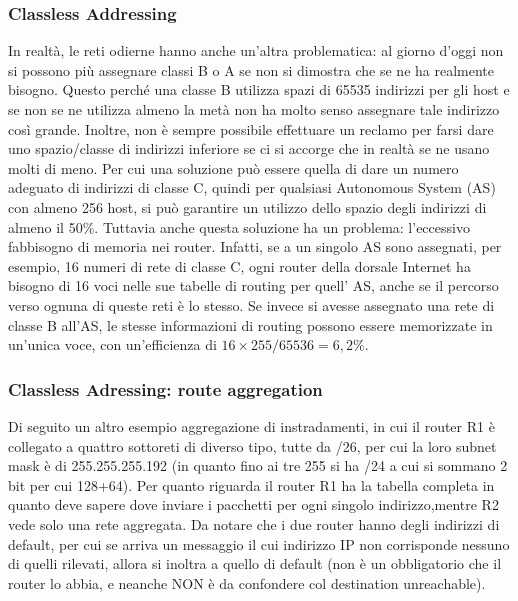 \subsubsection{Classless Addressing}
In realtà, le reti odierne hanno anche un’altra problematica: al giorno d’oggi non si possono più assegnare classi B o A se non si dimostra che se ne ha realmente bisogno. Questo perché una classe B utilizza spazi di 65535 indirizzi per gli host e se non se ne utilizza almeno la metà non ha molto senso assegnare tale indirizzo così grande. Inoltre, non è sempre possibile effettuare un reclamo per farsi dare uno spazio/classe di indirizzi inferiore se ci si accorge che in realtà se ne usano molti di meno. Per cui una soluzione può essere quella di dare un numero adeguato di indirizzi di classe C, quindi per qualsiasi Autonomous System (AS) con almeno 256 host, si può garantire un utilizzo dello spazio degli indirizzi di almeno il 50\%. Tuttavia anche questa soluzione ha un problema: l’eccessivo fabbisogno di memoria nei router. Infatti, se a un singolo AS sono assegnati, per esempio, 16 numeri di rete di classe C, ogni router della dorsale Internet ha bisogno di 16 voci nelle sue tabelle di routing per quell’ AS, anche se il percorso verso ognuna di queste reti è lo stesso. Se invece si avesse assegnato una rete di classe B all’AS, le stesse informazioni di routing possono essere memorizzate in un’unica voce, con un’efficienza di $16 × 255 / 65536 = 6,2\%$.
\subsubsection{Classless Adressing: route aggregation}
Di seguito un altro esempio aggregazione di instradamenti, in cui il router R1 è collegato a quattro sottoreti di diverso tipo, tutte da /26, per cui la loro subnet mask è di 255.255.255.192 (in quanto fino ai tre 255 si ha /24 a cui si sommano 2 bit per cui 128+64). Per quanto riguarda il router R1 ha la tabella completa in quanto deve sapere dove inviare i pacchetti per ogni singolo indirizzo,mentre R2 vede solo una rete aggregata. Da notare che i due router hanno degli indirizzi di default, per cui se arriva un messaggio il cui indirizzo IP non corrisponde nessuno di quelli rilevati, allora si inoltra a quello di default (non è un obbligatorio che il router lo abbia, e neanche NON è da confondere col destination unreachable).

